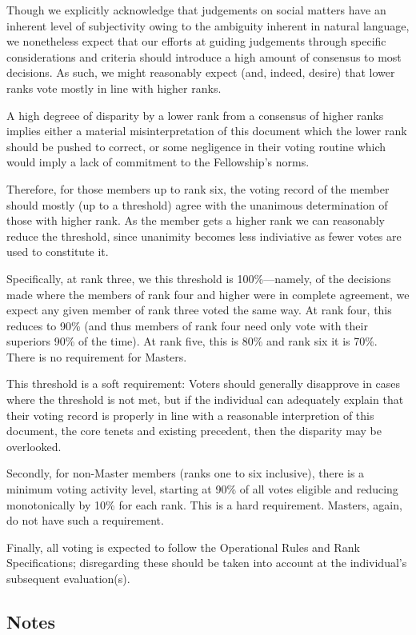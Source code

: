 \documentclass[9pt,oneside]{amsart}
\begin{document}
Though we explicitly acknowledge that judgements on social matters have an inherent level of subjectivity owing to the ambiguity inherent in natural language, we nonetheless expect that our efforts at guiding judgements through specific considerations and criteria should introduce a high amount of consensus to most decisions. As such, we might reasonably expect (and, indeed, desire) that lower ranks vote mostly in line with higher ranks.

A high degreee of disparity by a lower rank from a consensus of higher ranks implies either a material misinterpretation of this document which the lower rank should be pushed to correct, or some negligence in their voting routine which would imply a lack of commitment to the Fellowship's norms.

Therefore, for those members up to rank six, the voting record of the member should mostly (up to a threshold) agree with the unanimous determination of those with higher rank. As the member gets a higher rank we can reasonably reduce the threshold, since unanimity becomes less indiviative as fewer votes are used to constitute it.

Specifically, at rank three, we this threshold is 100\%---namely, of the decisions made where the members of rank four and higher were in complete agreement, we expect any given member of rank three voted the same way. At rank four, this reduces to 90\% (and thus members of rank four need only vote with their superiors 90\% of the time). At rank five, this is 80\% and rank six it is 70\%. There is no requirement for Masters.

This threshold is a soft requirement: Voters should generally disapprove in cases where the threshold is not met, but if the individual can adequately explain that their voting record is properly in line with a reasonable interpretion of this document, the core tenets and existing precedent, then the disparity may be overlooked.

Secondly, for non-Master members (ranks one to six inclusive), there is a minimum voting activity level, starting at 90\% of all votes eligible and reducing monotonically by 10\% for each rank. This is a hard requirement. Masters, again, do not have such a requirement.

Finally, all voting is expected to follow the Operational Rules and Rank Specifications; disregarding these should be taken into account at the individual's subsequent evaluation(s).

\subsection{Notes}\label{notes}
\end{document}
